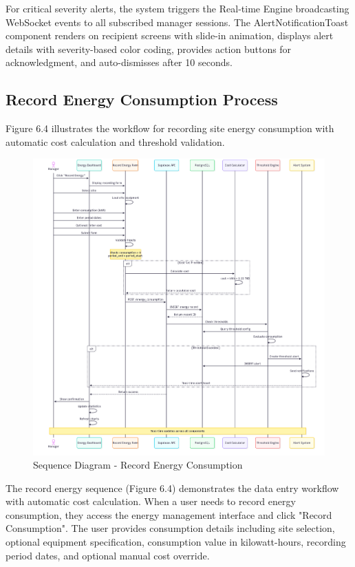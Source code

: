 For critical severity alerts, the system triggers the Real-time Engine broadcasting WebSocket events to all subscribed manager sessions. The AlertNotificationToast component renders on recipient screens with slide-in animation, displays alert details with severity-based color coding, provides action buttons for acknowledgment, and auto-dismisses after 10 seconds.

\subsection{Record Energy Consumption Process}

Figure 6.4 illustrates the workflow for recording site energy consumption with automatic cost calculation and threshold validation.

\begin{figure}[H]
    \centering
    \includegraphics[width=0.95\linewidth]{img/chap_06/sequence_record_energy.png}
    \caption{Sequence Diagram - Record Energy Consumption}
    \label{fig:sequence_record_energy}
\end{figure}

The record energy sequence (Figure 6.4) demonstrates the data entry workflow with automatic cost calculation. When a user needs to record energy consumption, they access the energy management interface and click "Record Consumption". The user provides consumption details including site selection, optional equipment specification, consumption value in kilowatt-hours, recording period dates, and optional manual cost override.

